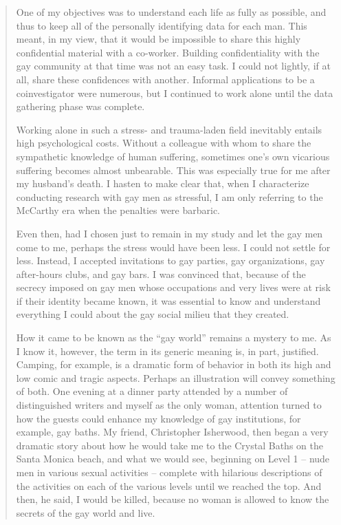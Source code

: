 \begin{quote}
One of my objectives was to understand each life as fully as possible, and thus to keep all of the personally identifying data for each man. This meant, in my view, that it would be impossible to share this highly confidential material with a co-worker. Building confidentiality with the gay community at that time was not an easy task. I could not lightly, if at all, share these confidences with another. Informal applications to be a coinvestigator were numerous, but I continued to work alone until the data gathering phase was complete.

Working alone in such a stress- and trauma-laden field inevitably entails high psychological costs. Without a colleague with whom to share the sympathetic knowledge of human suffering, sometimes one's own vicarious suffering becomes almost unbearable. This was especially true for me after my husband's death. I hasten to make clear that, when I characterize conducting research with gay men as stressful, I am only referring to the McCarthy era when the penalties were barbaric.

Even then, had I chosen just to remain in my study and let the gay men come to me, perhaps the stress would have been less. I could not settle for less. Instead, I accepted invitations to gay parties, gay organizations, gay after-hours clubs, and gay bars. I was convinced that, because of the secrecy imposed on gay men whose occupations and very lives were at risk if their identity became known, it was essential to know and understand everything I could about the gay social milieu that they created.

How it came to be known as the ``gay world'' remains a mystery to me. As I know it, however, the term in its generic meaning is, in part, justified. Camping, for example, is a dramatic form of behavior in both its high and low comic and tragic aspects. Perhaps an illustration will convey something of both. One evening at a dinner party attended by a number of distinguished writers and myself as the only woman, attention turned to how the guests could enhance my knowledge of gay institutions, for example, gay baths. My friend, Christopher Isherwood, then began a very dramatic story about how he would take me to the Crystal Baths on the Santa Monica beach, and what we would see, beginning on Level 1 – nude men in various sexual activities – complete with hilarious descriptions of the activities on each of the various levels until we reached the top. And then, he said, I would be killed, because no woman is allowed to know the secrets of the gay world and live.


\end{quote}
